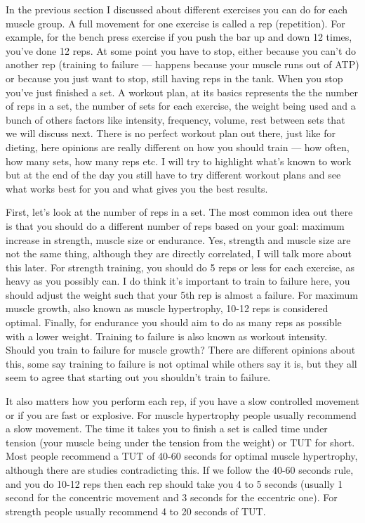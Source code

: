 \documentclass[openany, 12pt]{book}
\begin{document}
        In the previous section I discussed about different exercises you can do for each muscle group. A full movement for one exercise is called a rep (repetition). For example, for the bench press
        exercise if you push the bar up and down 12 times, you've done 12 reps. At some point you have to stop, either because you can't do another rep (training to failure --- happens because your
        muscle runs out of ATP) or because you just want to stop, still having reps in the tank. When you stop you've just finished a set. A workout plan, at its basics represents the 
        the number of reps in a set, the number of sets for each exercise, the weight being used and a bunch of others factors like intensity, frequency, volume, rest between sets that we will discuss
        next. There is no perfect workout plan out there, just like for dieting, here opinions are really different on how you should train --- how often, how many sets, how many reps etc.
        I will try to highlight what's known to work but at the end of the day you still have to try different workout plans and see what works best for you and what gives you the best results.

        First, let's look at the number of reps in a set. The most common idea out there is that you should do a different number of reps based on your goal: maximum increase in strength, muscle size or
        endurance. Yes, strength and muscle size are not the same thing, although they are directly correlated, I will talk more about this later. For strength training, you should do 5 reps or less
        for each exercise, as heavy as you possibly can. I do think it's important to train to failure here, you should adjust the weight such that your 5th rep is almost a failure.
        For maximum muscle growth, also known as muscle hypertrophy, 10-12 reps is considered optimal. Finally, for endurance you should aim to do as many reps as possible with a lower weight.
        Training to failure is also known as workout intensity. Should you train to failure for muscle growth? There are different opinions about this, some say training to failure is not optimal
        while others say it is, but they all seem to agree that starting out you shouldn't train to failure.
        
        It also matters how you perform each rep, if you have a slow controlled movement or if you are fast or explosive. For muscle hypertrophy people usually recommend a slow movement.
        The time it takes you to finish a set is called time under tension
        (your muscle being under the tension from the weight) or TUT for short. Most people recommend a TUT of 40-60 seconds for optimal muscle hypertrophy, although there are studies contradicting this.
        If we follow the 40-60 seconds rule, and you do 10-12 reps then
        each rep should take you 4 to 5 seconds (usually 1 second for the concentric movement and 3 seconds for the eccentric one). For strength people usually recommend 4 to 20 seconds of TUT.
\end{document}

